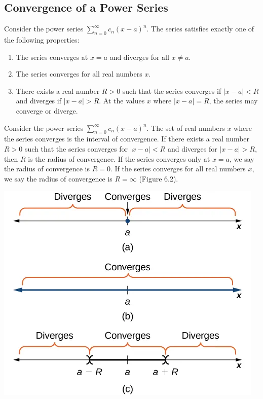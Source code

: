 \documentclass{report}
\begin{document}
    \subsection*{Convergence of a Power Series}
    \bigbreak \noindent 
    \begin{thrm}
        Consider the power series \(\sum_{n=0}^{\infty} c_n (x - a)^n\). The series satisfies exactly one of the following properties:
        \begin{enumerate}[label=(\roman*)]
            \item The series converges at \( x = a \) and diverges for all \( x \neq a \).
            \item The series converges for all real numbers \( x \).
            \item There exists a real number \( R > 0 \) such that the series converges if \( |x - a| < R \) and diverges if \( |x - a| > R \). At the values \( x \) where \( |x - a| = R \), the series may converge or diverge.
        \end{enumerate}
    \end{thrm}
    \bigbreak \noindent 
    \begin{definition}
        Consider the power series \(\sum_{n=0}^{\infty} c_n (x - a)^n\). The set of real numbers \( x \) where the series converges is the interval of convergence. If there exists a real number \( R > 0 \) such that the series converges for \( |x - a| < R \) and diverges for \( |x - a| > R \), then \( R \) is the radius of convergence. If the series converges only at \( x = a \), we say the radius of convergence is \( R = 0 \). If the series converges for all real numbers \( x \), we say the radius of convergence is \( R = \infty \) (Figure 6.2).
    \end{definition}
    \bigbreak \noindent 
    \begin{center}
        \includegraphics[scale=0.5]{./figures/popp.png}
    \end{center}
\end{document}
